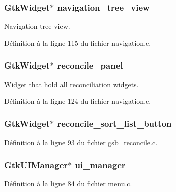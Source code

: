 \subsubsection[{navigation\_\-tree\_\-view}]{\setlength{\rightskip}{0pt plus 5cm}GtkWidget$\ast$ {\bf navigation\_\-tree\_\-view}}\label{gsb__reconcile_8c_a1cd17e8b2fd91a191f8d5d6a7e5f6979}
Navigation tree view. 

Définition à la ligne 115 du fichier navigation.c.

\subsubsection[{reconcile\_\-panel}]{\setlength{\rightskip}{0pt plus 5cm}GtkWidget$\ast$ {\bf reconcile\_\-panel}}\label{gsb__reconcile_8c_a0356c8380fe78fe23dc212255df45e4b}
Widget that hold all reconciliation widgets. 

Définition à la ligne 124 du fichier navigation.c.

\subsubsection[{reconcile\_\-sort\_\-list\_\-button}]{\setlength{\rightskip}{0pt plus 5cm}GtkWidget$\ast$ {\bf reconcile\_\-sort\_\-list\_\-button}}\label{gsb__reconcile_8c_a3cc34f74c4d6dae91c269439b2ea894c}


Définition à la ligne 93 du fichier gsb\_\-reconcile.c.

\subsubsection[{ui\_\-manager}]{\setlength{\rightskip}{0pt plus 5cm}GtkUIManager$\ast$ {\bf ui\_\-manager}}\label{gsb__reconcile_8c_aa6a3b64b294a67080fe530ae293bce63}


Définition à la ligne 84 du fichier menu.c.

